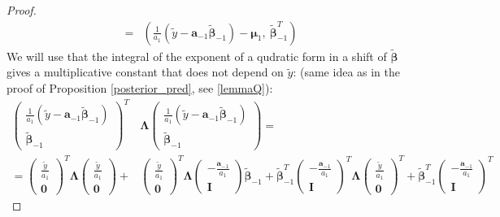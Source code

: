 \documentclass[10pt,fleqn]{amsart}
\theoremstyle{definition}
\theoremstyle{remark}
\numberwithin{equation}{section}
\newcommand{\aaa}{\boldsymbol{a}}
\newcommand{\bbeta}{\boldsymbol{\beta}}
\newcommand{\mmu}{\boldsymbol{\mu}}
\newcommand{\LLambda}{\boldsymbol{\Lambda}}
\newcommand{\bbetatilde}{\widetilde{\bbeta}}
\newcommand{\ytilde}{\widetilde{y}}
\begin{document}
\begin{proof}
\begin{equation*}
\begin{split}
    =&\left(\frac{1}{a_1}\left(\ytilde-\aaa_{-1}\bbetatilde_{-1}\right)-\mmu_1,\ \bbetatilde_{-1}^T\right)
\end{split}\end{equation*}
We will use that the integral of the exponent of a qudratic form in a shift of $\bbetatilde$ gives a multiplicative constant that
does not depend on $\ytilde$:
(same idea as in the proof of Proposition \ref{posterior_pred}, see \ref{lemmaQ}):
\begin{equation*}\begin{split}
    \left(\begin{matrix}\frac 1{a_1}\left(\ytilde-\aaa_{-1}\bbetatilde_{-1}\right)\\\bbetatilde_{-1}\end{matrix}\right)^T
    &\LLambda
    \left(\begin{matrix}\frac 1{a_1}\left(\ytilde-\aaa_{-1}\bbetatilde_{-1}\right)\\\bbetatilde_{-1}\end{matrix}\right)=\\
    =\left(\begin{matrix}\frac \ytilde{a_1}\\\boldsymbol{0}\end{matrix}\right)^T
    \LLambda
    \left(\begin{matrix}\frac \ytilde{a_1}\\\boldsymbol{0}\end{matrix}\right)+
    &\left(\begin{matrix}\frac \ytilde{a_1}\\\boldsymbol{0}\end{matrix}\right)^T
    \LLambda
    \left(\begin{matrix}-\frac {\aaa_{-1}}{a_1}\\\boldsymbol{I}\end{matrix}\right)\bbetatilde_{-1}+
    \bbetatilde_{-1}^T\left(\begin{matrix}-\frac {\aaa_{-1}}{a_1}\\\boldsymbol{I}\end{matrix}\right)^T
    \LLambda
    \left(\begin{matrix}\frac \ytilde{a_1}\\\boldsymbol{0}\end{matrix}\right)^T+
    \bbetatilde_{-1}^T\left(\begin{matrix}-\frac {\aaa_{-1}}{a_1}\\\boldsymbol{I}\end{matrix}\right)^T

\end{split}
\end{equation*}
\end{proof}
\end{document}
